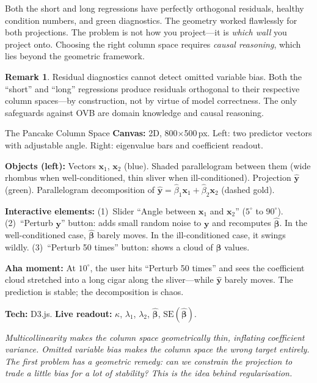 \documentclass[11pt,a4paper]{article}
\theoremstyle{plain}
\theoremstyle{definition}
\newtheorem{remark}[theorem]{Remark}
\newcommand{\yhat}{\hat{\bm{y}}}
\newcommand{\bhat}{\hat{\bm{\beta}}}
\newcommand{\by}{\bm{y}}
\begin{document}
Both the short and long regressions have perfectly orthogonal residuals,
healthy condition numbers, and green diagnostics.
The geometry worked flawlessly for both projections.
The problem is not how you project---it is \emph{which wall} you
project onto.
Choosing the right column space requires \emph{causal reasoning},
which lies beyond the geometric framework.

\begin{remark}
Residual diagnostics cannot detect omitted variable bias. Both the
``short'' and ``long'' regressions produce residuals orthogonal to
their respective column spaces---by construction, not by virtue of
model correctness. The only safeguards against OVB are domain
knowledge and causal reasoning.
\end{remark}

\begin{vizspec}{The Pancake Column Space}
\textbf{Canvas:} 2D, 800$\times$500\,px.  Left: two predictor vectors
with adjustable angle.  Right: eigenvalue bars and coefficient readout.

\textbf{Objects (left):} Vectors $\bm{x}_1$, $\bm{x}_2$
(\textcolor{colspace}{blue}).  Shaded parallelogram between them
(wide rhombus when well-conditioned, thin sliver when ill-conditioned).
Projection $\yhat$ (\textcolor{projection}{green}).  Parallelogram
decomposition of $\yhat = \hat\beta_1\bm{x}_1 + \hat\beta_2\bm{x}_2$
(dashed \textcolor{response}{gold}).

\textbf{Interactive elements:}
(1)~Slider ``Angle between $\bm{x}_1$ and $\bm{x}_2$'' ($5^\circ$ to
$90^\circ$).
(2)~``Perturb $\by$'' button: adds small random noise to $\by$ and
recomputes $\bhat$.  In the well-conditioned case, $\bhat$ barely
moves.  In the ill-conditioned case, it swings wildly.
(3)~``Perturb 50 times'' button: shows a cloud of $\bhat$ values.

\textbf{Aha moment:} At $10^\circ$, the user hits ``Perturb 50 times''
and sees the coefficient cloud stretched into a long cigar along the
sliver---while $\yhat$ barely moves.  The prediction is stable; the
decomposition is chaos.

\textbf{Tech:} D3.js.
\quad \textbf{Live readout:} $\kappa$, $\lambda_1$, $\lambda_2$,
$\bhat$, $\text{SE}(\bhat)$.
\end{vizspec}

\medskip
\noindent\textit{Multicollinearity makes the column space geometrically
thin, inflating coefficient variance.
Omitted variable bias makes the column space the wrong target entirely.
The first problem has a geometric remedy: can we \emph{constrain}
the projection to trade a little bias for a lot of stability?
This is the idea behind regularisation.}
\end{document}
